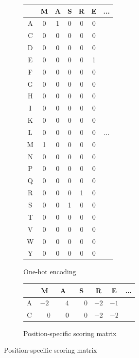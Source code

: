 \documentclass{l4proj}
\begin{document}
\begin{figure}[!ht]
    \centering
    \begin{subfigure}[h]{0.45\textwidth}
        \centering
        \caption{One-hot encoding}
        \label{fig:feat1}
        \begin{tabular}{|c|cccccc|}
        \hline
          & M & A & S & R & E & ...\\ \hline
        A & 0 & 1 & 0 & 0 & 0 & \\ 
        C & 0 & 0 & 0 & 0 & 0 & \\ 
        D & 0 & 0 & 0 & 0 & 0 & \\ 
        E & 0 & 0 & 0 & 0 & 1 & \\ 
        F & 0 & 0 & 0 & 0 & 0 & \\ 
        G & 0 & 0 & 0 & 0 & 0 & \\ 
        H & 0 & 0 & 0 & 0 & 0 & \\ 
        I & 0 & 0 & 0 & 0 & 0 & \\ 
        K & 0 & 0 & 0 & 0 & 0 & \\ 
        L & 0 & 0 & 0 & 0 & 0 & ...\\ 
        M & 1 & 0 & 0 & 0 & 0 & \\ 
        N & 0 & 0 & 0 & 0 & 0 & \\ 
        P & 0 & 0 & 0 & 0 & 0 & \\ 
        Q & 0 & 0 & 0 & 0 & 0 & \\ 
        R & 0 & 0 & 0 & 1 & 0 & \\ 
        S & 0 & 0 & 1 & 0 & 0 & \\ 
        T & 0 & 0 & 0 & 0 & 0 & \\ 
        V & 0 & 0 & 0 & 0 & 0 & \\ 
        W & 0 & 0 & 0 & 0 & 0 & \\ 
        Y & 0 & 0 & 0 & 0 & 0 & \\ \hline
        \end{tabular}
    \end{subfigure}
    \begin{subfigure}[h]{0.45\textwidth}
        \centering
        \caption{Position-specific scoring matrix}
        \label{fig:feat2}
        \begin{tabular}{|c|cccccc|}
        \hline
        & M & A & S & R & E & ...\\ \hline
        A & $-2$ & $\phantom{-}4$ & $\phantom{-}0$ & $-2$ & $-1$ & \\
        C & $\phantom{-}0$ & $\phantom{-}0$ & $\phantom{-}0$ & $-2$ & $-2$ & \\

\end{tabular}
\end{subfigure}
\end{figure}
\end{document}
